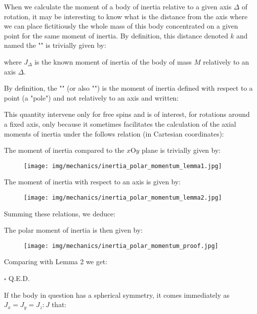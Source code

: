 	When we calculate the moment of a body of inertia relative to a given axis $\Delta$ of rotation, it may be interesting to know what is the distance from the axis where we can place fictitiously the whole mass of this body concentrated on a given point for the same moment of inertia. By definition, this distance denoted $k$ and named the "" is trivially given by:
	
	where $J_\Delta$ is the known moment of inertia of the body of mass $M$ relatively to an axis $\Delta$.
	
	By definition, the "" (or also "") is the moment of inertia defined with respect to a point (a "pole") and not relatively to an axis and written:
	
	This quantity intervene only for free spins and is of interest, for rotations around a fixed axis, only because it sometimes facilitates the calculation of the axial moments of inertia under the follows relation (in Cartesian coordinates):
	
	\begin{dem}
	\begin{lemma}
	The moment of inertia compared to the $x$O$y$ plane is trivially given by:
	
	\begin{figure}[H]
		\centering
		\texttt{[image: img/mechanics/inertia\_polar\_momentum\_lemma1.jpg]}
	\end{figure}
	\end{lemma}
	\begin{lemma}
	The moment of inertia with respect to an axis is given by:
	
	\begin{figure}[H]
		\centering
		\texttt{[image: img/mechanics/inertia\_polar\_momentum\_lemma2.jpg]}
	\end{figure}
	\end{lemma}
	Summing these relations, we deduce:
	
	The polar moment of inertia is then given by:
	
	\begin{figure}[H]
		\centering
		\texttt{[image: img/mechanics/inertia\_polar\_momentum\_proof.jpg]}
	\end{figure}
	Comparing with Lemma 2 we get:
	
	\begin{flushright}
		$\square$  Q.E.D.
	\end{flushright}
	\end{dem}
	If the body in question has a spherical symmetry, it comes immediately as $J_x=J_y=J_z:J$ that:
	

